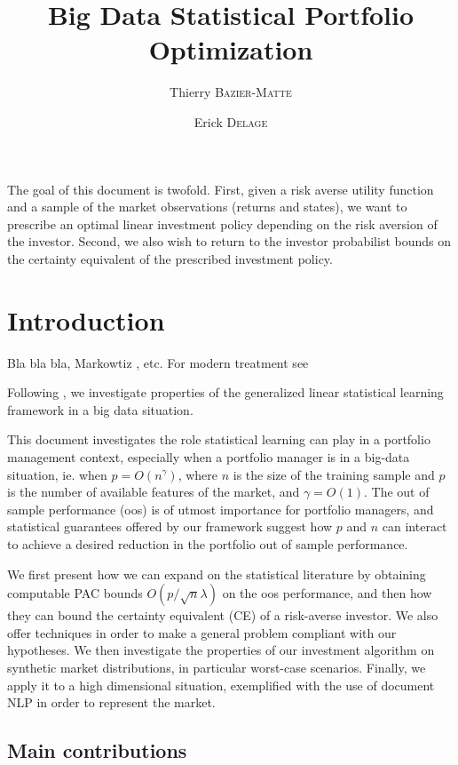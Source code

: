 \documentclass[10pt]{article}
\title{Big Data Statistical Portfolio Optimization}
\author{Thierry \textsc{Bazier-Matte} \and Erick \textsc{Delage}}
\begin{document}
\maketitle


The goal of this document is twofold. First, given a risk averse utility function and a
sample of the market observations (returns and states), we want to prescribe an optimal
linear investment policy depending on the risk aversion of the investor. Second, we also
wish to return to the investor probabilist bounds on the certainty equivalent of the
prescribed investment policy.

\section{Introduction}
\label{sec:intro}

Bla bla bla, Markowtiz \cite{markowitz1952portfolio}, etc. For modern treatment see

Following \cite{rudin2015big}, we investigate properties of the generalized linear
statistical learning framework in a big data situation.


This document investigates the role statistical learning can play in a portfolio
management context, especially when a portfolio manager is in a big-data situation,
ie. when $p=O(n^\gamma)$, where $n$ is the size of the training sample and $p$ is the number of
available features of the market, and $\gamma=O(1)$. The out of sample performance (oos) is of
utmost importance for portfolio managers, and statistical guarantees offered by our
framework suggest how $p$ and $n$ can interact to achieve a desired reduction in the
portfolio out of sample performance.

We first present how we can expand on the statistical literature by obtaining computable
PAC bounds $O(p/\sqrt{n}\lambda)$ on the oos performance, and then how they can bound the
certainty equivalent (CE) of a risk-averse investor. We also offer techniques in order to
make a general problem compliant with our hypotheses. We then investigate the properties
of our investment algorithm on synthetic market distributions, in particular worst-case
scenarios. Finally, we apply it to a high dimensional situation, exemplified with the use
of document NLP in order to represent the market.

\subsection{Main contributions}
\end{document}

